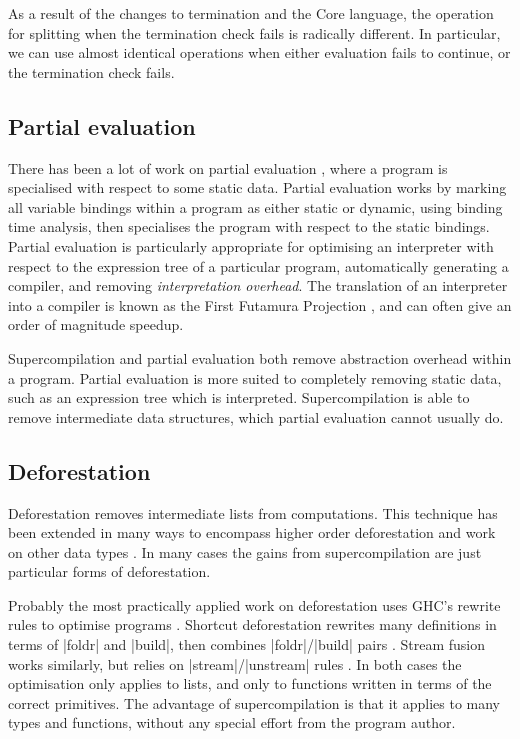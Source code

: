 \documentclass[draft]{sigplanconf}
\begin{document}
As a result of the changes to termination and the Core language, the operation for splitting when the termination check fails is radically different. In particular, we can use almost identical operations when either evaluation fails to continue, or the termination check fails.

\subsection{Partial evaluation}

There has been a lot of work on partial evaluation \cite{jones:partial_evaluation}, where a program is specialised with respect to some static data. Partial evaluation works by marking all variable bindings within a program as either static or dynamic, using binding time analysis, then specialises the program with respect to the static bindings. Partial evaluation is particularly appropriate for optimising an interpreter with respect to the expression tree of a particular program, automatically generating a compiler, and removing \textit{interpretation overhead}. The translation of an interpreter into a compiler is known as the First Futamura Projection \cite{futanama:projections}, and can often give an order of magnitude speedup.

Supercompilation and partial evaluation both remove abstraction overhead within a program. Partial evaluation is more suited to completely removing static data, such as an expression tree which is interpreted. Supercompilation is able to remove intermediate data structures, which partial evaluation cannot usually do.

\subsection{Deforestation}

Deforestation \cite{wadler:deforestation} removes intermediate lists from computations. This technique has been extended in many ways to encompass higher order deforestation \cite{marlow:higher_order_deforestation} and work on other data types \cite{coutts:string_fusion}. In many cases the gains from supercompilation are just particular forms of deforestation.

Probably the most practically applied work on deforestation uses GHC's rewrite rules to optimise programs \cite{spj:rules}. Shortcut deforestation rewrites many definitions in terms of |foldr| and |build|, then combines |foldr|/|build| pairs \cite{gill:shortcut_deforestation}. Stream fusion works similarly, but relies on |stream|/|unstream| rules \cite{coutts:stream_fusion}. In both cases the optimisation only applies to lists, and only to functions written in terms of the correct primitives. The advantage of supercompilation is that it applies to many types and functions, without any special effort from the program author.
\end{document}
